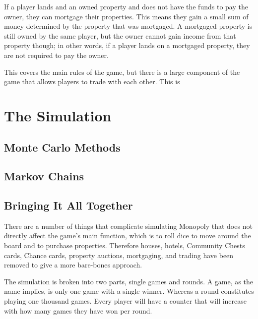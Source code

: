 \documentclass{article}
\begin{document}
If a player lands and an owned property and does not have the funds to pay the owner, they can mortgage their properties.  This means they gain a small sum of money determined by the property that was mortgaged.  A mortgaged property is still owned by the same player, but the owner cannot gain income from that property though; in other words, if a player lands on a mortgaged property, they are not required to pay the owner.

	This covers the main rules of the game, but there is a large component of the game that allows players to trade with each other.  This is 

\section{The Simulation}

\subsection{Monte Carlo Methods}

\subsection{Markov Chains}

\subsection{Bringing It All Together}

There are a number of things that complicate simulating Monopoly that does not directly affect the game’s main function, which is to roll dice to move around the board and to purchase properties.  Therefore houses, hotels, Community Chests cards, Chance cards, property auctions, mortgaging, and trading have been removed to give a more bare-bones approach.

	The simulation is broken into two parts, single games and rounds.  A game, as the name implies, is only one game with a single winner.  Whereas a round constitutes playing one thousand games.  Every player will have a counter that will increase with how many games they have won per round.
\end{document}
